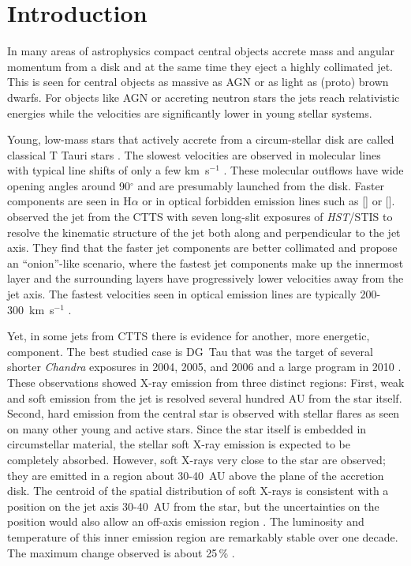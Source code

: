 \documentclass[manuscript]{aastex}
\begin{document}
\section{Introduction} 
In many areas of astrophysics compact central objects accrete mass and angular momentum from a disk and at the same time they eject a highly collimated jet. This is seen for central objects as massive as AGN or as light as (proto) brown dwarfs. For objects like AGN or accreting neutron stars the jets reach relativistic energies while the velocities are significantly lower in young stellar systems. 

Young, low-mass stars that actively accrete from a circum-stellar disk are called classical T Tauri stars \citep[for a review see][]{2013AN....334...67G}. The slowest velocities are observed in molecular lines with typical line shifts of only a few km~s$^{-1}$ \citep{2008ApJ...676..472B}. These molecular outflows have wide opening angles around 90$^{\circ}$ \citep[e.g.][]{2013A&A...557A.110S,2014A&A...564A..11A} and are presumably launched from the disk. Faster components are seen in H$\alpha$ or in optical forbidden emission lines such as [] or []. \citet{2000ApJ...537L..49B} observed the jet from the CTTS  with seven long-slit exposures of \emph{HST}/STIS to resolve the kinematic structure of the jet both along and perpendicular to the jet axis. They find that the faster jet components are better collimated and propose an ``onion''-like scenario, where the fastest jet components make up the innermost layer and the surrounding layers have progressively lower velocities away from the jet axis. The fastest velocities seen in optical emission lines are typically 200-300~km~s$^{-1}$ \citep{2004Ap&SS.292..651B,2008ApJ...689.1112C,2013A&A...550L...1S}.

Yet, in some jets from CTTS there is evidence for another, more energetic, component. The best studied case is DG~Tau that was the target of several shorter \emph{Chandra} exposures in 2004, 2005, and 2006 and a large program in 2010 \citep{2005ApJ...626L..53G,2008A&A...478..797G,2011ASPC..448..617G}. These observations showed X-ray emission from three distinct regions: First, weak and soft emission from the jet is resolved several hundred AU from the star itself. Second, hard emission from the central star is observed with stellar flares as seen on many other young and active stars. Since the star itself is embedded in circumstellar material, the stellar soft X-ray emission is expected to be completely absorbed. However, soft X-rays very close to the star are observed; they are emitted in a region about 30-40~AU above the plane of the accretion disk. The centroid of the spatial distribution of soft X-rays is consistent with a position on the jet axis 30-40~AU from the star, but the uncertainties on the position would also allow an off-axis emission region \citep{2008A&A...488L..13S}. The luminosity and temperature of this inner emission region are remarkably stable over one decade. The maximum change observed is about 25\,\% \citep{SchneiderDGTauXray}.
\end{document}

